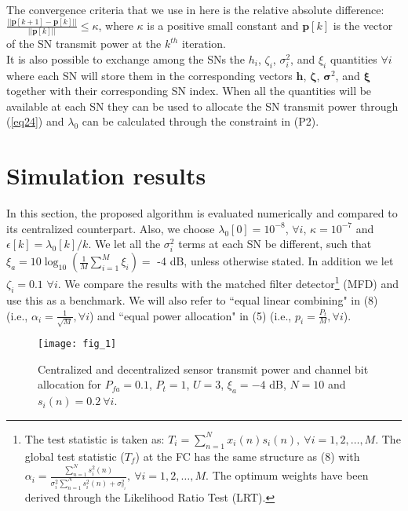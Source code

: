 \documentclass[conference]{IEEEtran}
\begin{document}
The convergence criteria that we use in here is the relative absolute difference: $\frac{||\boldsymbol p[k+1]-\boldsymbol p[k]||}{||\boldsymbol p[k]||}\leq \kappa$, where $\kappa$ is a positive small constant and $\boldsymbol p[k]$ is the vector of the SN transmit power at the $k^{th}$ iteration.\\
 \indent It is also possible to exchange among the SNs the $h_i$, $\zeta_i$, $\sigma_i^2$, and $\xi_i$ quantities $\forall i$ where each SN will store them  in the corresponding vectors $\boldsymbol h$, $\boldsymbol{\zeta}$, $\boldsymbol {\sigma}^2$, and $\boldsymbol{\xi}$ together with their corresponding SN index. When all the quantities will be available at each SN they can be used to allocate the SN transmit power through (\ref{eq24}) and $\lambda_0$ can be calculated through the constraint in (P2). 
\section{Simulation results}
\label{SIMULATION RESULTS}
In this section, the proposed algorithm is evaluated numerically and compared to its centralized counterpart. Also, we choose $\lambda_0[0]=10^{-8}$, $\forall i$, $\kappa=10^{-7}$ and $\epsilon\left[k\right]= \lambda_0[k]/k$. We let all the  $\sigma_i^{2}$ terms at each SN be different, such that $\xi_a=10\log_{10}\left(\frac{1}{M}\sum \limits_{i=1}^M \xi_i \right)=$ -4 dB, unless otherwise stated. In addition we let $\zeta_i=0.1$ $\forall i$. We compare the results with the matched filter detector\footnote{The test statistic is taken as: $T_i=\sum \limits_{n=1}^N x_i(n)s_i(n),  \ \forall i = 1, 2, \ldots, M$. The global test statistic ($T_f$) at the FC has the same structure as (8) with $\alpha_i=\frac{\sum \limits_{n=1}^N s^2_i(n)}{\sigma^2_i\sum \limits_{n=1}^N s^2_i(n)+\sigma^{2}_{v_i}},\ \forall i = 1, 2, \ldots, M.$ The optimum weights have been derived through the Likelihood Ratio Test (LRT).} (MFD) and use this as a benchmark. We will also refer to ``equal linear combining" in (8) (i.e., $\alpha_i=\frac{1}{\sqrt{M}}, \forall i$) and ``equal power allocation" in (5) (i.e., $p_i=\frac{P_t}{{M}}, \forall i$).
\begin{figure}[!htp]
\centerline{\texttt{[image: fig\_1]}}
\caption[Centralized and decentralized sensor transmit power and channel bit allocation for $P_{fa}=0.1$, $P_t=1$, $U=3$ and $N=10$]{\label{fig:fig_1}
Centralized and decentralized sensor transmit power and channel bit allocation for $P_{fa}=0.1$, $P_t=1$, $U=3$, $\xi_a=-4$ dB, $N=10$ and $s_i(n)=0.2 \ \forall i$.}
\vspace{0.22cm}
\end{figure}
\end{document}
